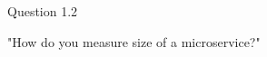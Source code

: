 \begin{shaded} Question 1.2 \end{shaded} \label{question:hybris_architecture/interview/question_1.2}
"How do you measure size of a microservice?"\\

\\

